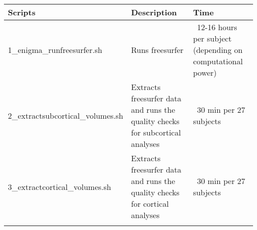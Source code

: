 \documentclass[twocolumn]{bmcart}%
\begin{document}
\begin{frontmatter}
\begin{fmbox}
\begin{artnotes}
\end{artnotes}




	








%
\end{fmbox}%

\end{frontmatter}


\begin{table*}
  \begin{tabular*}{\textwidth}{p{5cm}p{6cm}p{4cm}}
    Scripts  & Description  &  Time \\
      \hline\noalign{\smallskip}
      1_enigma_runfreesurfer.sh     &    Runs freesurfer      &    ~12-16 hours per subject (depending on computational power)    \\
      2_extractsubcortical_volumes.sh     &    Extracts freesurfer data and runs the quality checks for subcortical analyses      &    ~30 min per 27 subjects   \\
      3_extractcortical_volumes.sh     &    Extracts freesurfer data and runs the quality checks for cortical analyses     &     ~30 min per 27 subjects   \\
      \noalign{\smallskip}\hline
\end{tabular*}
\end{table*}
\end{document}
